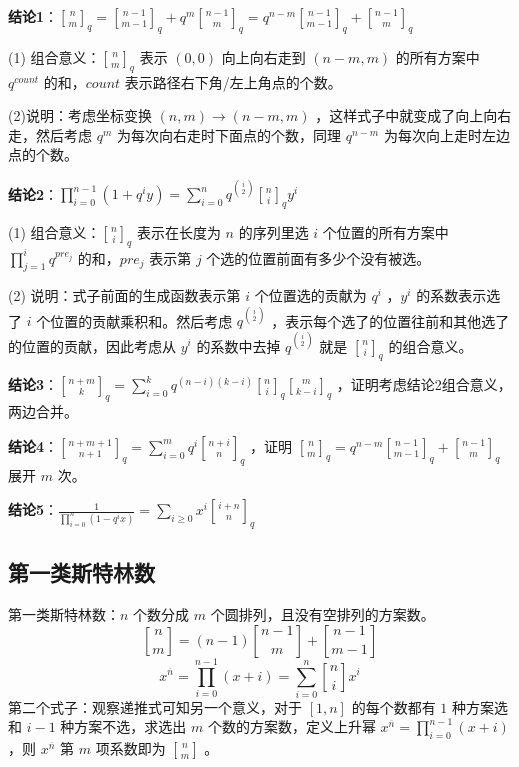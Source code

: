 \vspace{0.4cm}

\textbf{结论1}：$\displaystyle {n \brack m}_q = {n-1 \brack m-1}_q + q^m {n-1 \brack m}_q=q^{n-m} {n-1 \brack m-1}_q + {n-1 \brack m}_q$

\vspace{0.2cm}

(1) 组合意义：${n \brack m}_q$ 表示 $(0,0)$ 向上向右走到 $(n-m,m)$ 的所有方案中 $q^{count}$ 的和，$count$ 表示路径右下角/左上角点的个数。

(2)说明：考虑坐标变换 $(n,m)\to(n-m,m)$ ，这样式子中就变成了向上向右走，然后考虑 $q^m$ 为每次向右走时下面点的个数，同理 $q^{n-m}$ 为每次向上走时左边点的个数。


\vspace{0.4cm}

\textbf{结论2}：$\displaystyle \prod_{i=0}^{n-1} (1+q^iy) = \sum\limits_{i=0}^n q^{\binom{i}{2}} {n \brack i}_q y^i$

\vspace{0.2cm}

(1) 组合意义：${n \brack i}_q$ 表示在长度为 $n$ 的序列里选 $i$ 个位置的所有方案中 $\prod_{j=1}^{i}q^{pre_j}$ 的和，$pre_j$ 表示第 $j$ 个选的位置前面有多少个没有被选。

(2) 说明：式子前面的生成函数表示第 $i$ 个位置选的贡献为 $q^i$ ，$y^i$ 的系数表示选了 $i$ 个位置的贡献乘积和。然后考虑 $q^{i\choose 2}$ ，表示每个选了的位置往前和其他选了的位置的贡献，因此考虑从 $y^i$ 的系数中去掉 $q^{i\choose 2}$ 就是 ${n \brack i}_q$ 的组合意义。

\vspace{0.4cm}

\textbf{结论3}：$\displaystyle {n + m \brack k}_q = \sum\limits_{i=0}^k q^{(n-i)(k-i)} {n \brack i}_q {m \brack k-i}_q$ ，证明考虑结论2组合意义，两边合并。

\textbf{结论4}：$\displaystyle {n + m + 1 \brack n + 1}_q = \sum\limits_{i=0}^m q^i {n + i \brack n}_q$ ，证明 $\displaystyle {n \brack m}_q=q^{n-m} {n-1 \brack m-1}_q + {n-1 \brack m}_q$ 展开 $m$ 次。

\textbf{结论5}：$\displaystyle \frac{1}{\prod_{i=0}^n (1-q^ix)} = \sum\limits_{i \ge 0} x^i {i+n \brack n}_q$

\newpage

\subsection{第一类斯特林数}

第一类斯特林数：$n$ 个数分成 $m$ 个圆排列，且没有空排列的方案数。
$$
{n\brack m}=(n-1){n-1\brack m}+{n-1\brack m-1}
$$
$$
x^{\overline{n}}=\prod_{i=0}^{n-1}(x+i)=\sum_{i=0}^{n}{n\brack i}x^i
$$
第二个式子：观察递推式可知另一个意义，对于 $[1,n]$ 的每个数都有 $1$ 种方案选和 $i-1$ 种方案不选，求选出 $m$ 个数的方案数，定义上升幂 $x^{\overline{n}}=\prod_{i=0}^{n-1}(x+i)$ ，则 $x^{\overline{n}}$ 第 $m$ 项系数即为 ${n\brack m}$ 。

